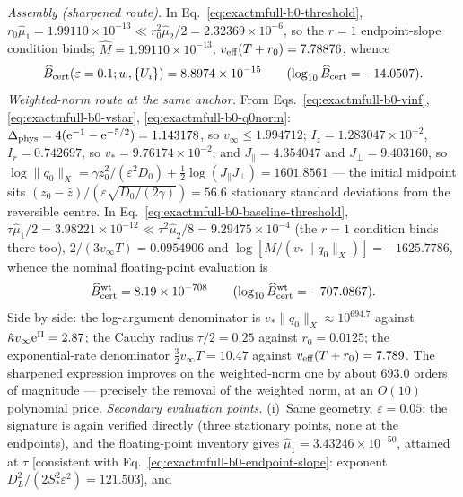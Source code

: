 \begin{remark}
\emph{Assembly (sharpened route).}  In
Eq.~\eqref{eq:exactmfull-b0-threshold},
\(r_0\widehat\mu_1=1.99110\times10^{-13}
\ll r_0^2\widehat\mu_2/2=2.32369\times10^{-6}\),
so the \(r=1\) endpoint-slope condition binds;
\(\widehat M=1.99110\times10^{-13}\),
\(v_{\rm eff}(T+r_0)=7.78876\), whence
\begin{equation}
 \widehat B_{\rm cert}(\varepsilon=0.1;w,\{U_i\})
 =8.8974\times10^{-15}
 \qquad(\log_{10}\widehat B_{\rm cert}=-14.0507).
 \label{eq:exactmfull-b0-anchor-value}
\end{equation}
\emph{Weighted-norm route at the same anchor.}  From
Eqs.~\eqref{eq:exactmfull-b0-vinf}, \eqref{eq:exactmfull-b0-vstar},
\eqref{eq:exactmfull-b0-q0norm}:
\(\Delta_{\rm phys}=4(\mathrm e^{-1}-\mathrm e^{-5/2})=1.143178\), so
\(v_\infty\le1.994712\); \(I_z=1.283047\times10^{-2}\),
\(I_r=0.742697\), so \(v_*=9.76174\times10^{-2}\); and
\(J_\parallel=4.354047\) and \(J_\perp=9.403160\), so
\(\log\|q_0\|_X=\gamma z_0^2/(\varepsilon^2D_0)
+\tfrac12\log(J_\parallel J_\perp)=1601.8561\) --- the initial midpoint sits
\((z_0-\bar z)/(\varepsilon\sqrt{D_0/(2\gamma)})=56.6\) stationary standard
deviations from the reversible centre.  In
Eq.~\eqref{eq:exactmfull-b0-baseline-threshold},
\(\tau\widehat\mu_1/2=3.98221\times10^{-12}
\ll\tau^2\widehat\mu_2/8=9.29475\times10^{-4}\)
(the \(r=1\) condition binds there too),
\(2/(3v_\infty T)=0.0954906\) and
\(\log[M/(v_*\|q_0\|_X)]=-1625.7786\), whence the nominal
floating-point evaluation is
\begin{equation}
 \widehat B_{\rm cert}^{\rm wt}=8.19\times10^{-708}
 \qquad(\log_{10}\widehat B_{\rm cert}^{\rm wt}=-707.0867).
 \label{eq:exactmfull-b0-baseline-anchor}
\end{equation}
Side by side: the log-argument denominator is
\(v_*\|q_0\|_X\approx10^{694.7}\) against
\(\hat\kappa v_\infty\mathrm e^{\Pi}=2.87\); the Cauchy radius \(\tau/2=0.25\)
against \(r_0=0.0125\); the exponential-rate denominator
\(\tfrac32v_\infty T=10.47\) against \(v_{\rm eff}(T+r_0)=7.789\).  The
sharpened expression improves on the weighted-norm one by about \(693.0\) orders
of magnitude --- precisely the removal of the weighted norm, at an
\(O(10)\) polynomial price.
\emph{Secondary evaluation points.}  (i)~Same geometry, \(\varepsilon=0.05\):
the signature is again verified directly (three stationary points, none at
the endpoints), and the floating-point inventory gives
\(\widehat\mu_1=3.43246\times10^{-50}\), attained at \(\tau\) [consistent with
Eq.~\eqref{eq:exactmfull-b0-endpoint-slope}: exponent
\(D_L^2/(2S_*^2\varepsilon^2)=121.503\)], and

\end{remark}
